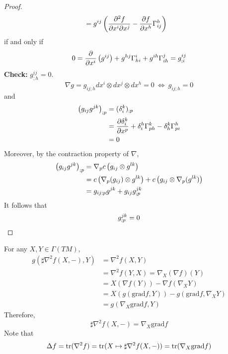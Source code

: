 \begin{enumerate}[label=\Roman{*}.]
\begin{proof}
\begin{equation*}
\begin{aligned}
				&= g^{ij}\left(\frac{\partial^2 f}{\partial x^i\partial x^j} - \frac{\partial f}{\partial x^h}\Gamma^h_{ij}\right)
			\end{aligned}
		\end{equation*}
		if and only if
		\begin{equation*}
			0 = \frac{\partial}{\partial x^i} \left(g^{ij}\right) +g^{hj}\Gamma^i_{hi} + g^{ih}\Gamma^j_{ih} = g^{ij}_{;i}
		\end{equation*}
		\textbf{Check:} $g^{ij}_{;h} = 0$.
		\begin{equation*}
			\nabla g = g_{ij;h}dx^i\otimes dx^j \otimes dx^h = 0 ~\Leftrightarrow~ g_{ij;h} = 0
		\end{equation*}
		and
		\begin{equation*}
			\begin{aligned}
				\left(g_{ij}g^{jk}\right)_{;p} &= (\delta^k_i)_{;p} \\
				&= \frac{\partial \delta^k_i}{\partial x^p} + \delta^h_i\Gamma^k_{ph} - \delta^k_h\Gamma^h_{pi} \\
				&= 0
			\end{aligned}
		\end{equation*}
		Moreover, by the contraction property of $\nabla$,
		\begin{equation*}
			\begin{aligned}
				\left(g_{ij}g^{jk}\right)_{;p} &= \nabla_p c\left(g_{ij} \otimes g^{lk}\right) \\
				&=c\left(\nabla_p (g_{ij}) \otimes g^{lk}\right) + c\left(g_{ij} \otimes \nabla_p(g^{lk})\right) \\
				&= g_{ij;p}g^{jk}+g_{ij}g^{jk}_{;p}
			\end{aligned}
		\end{equation*}
		It follows that
		\begin{equation*}
			g^{jk}_{;p} = 0\qedhere
		\end{equation*}
	\end{proof}
	\begin{rmk}
		For any $X,Y \in \Gamma(TM)$,
		\begin{equation*}
			\begin{aligned}
				g(\sharp \nabla^2f(X,-),Y) &= \nabla^2f(X,Y) \\
				&= \nabla^2f(Y,X) = \nabla_X (\nabla f)(Y) \\
				&= X(\nabla f (Y)) - \nabla f (\nabla_XY) \\
				&= X(g(\text{grad} f, Y)) - g(\text{grad}f,\nabla_XY)\\
				&=g(\nabla_X\text{grad} f, Y )
			\end{aligned}
		\end{equation*}
		Therefore,
		\begin{equation*}
			\sharp \nabla^2f(X,-) = \nabla_X\text{grad} f
		\end{equation*}
		Note that
		\begin{equation*}
			\Delta f = \operatorname{tr}(\nabla^2f) = \operatorname{tr}(X \mapsto \sharp \nabla^2f(X,-)) = \operatorname{tr}(\nabla_X\text{grad} f)
		\end{equation*}
	\end{rmk}
\end{enumerate}
